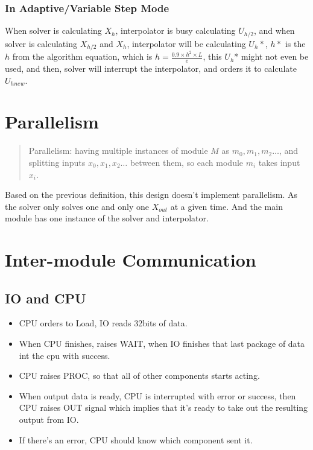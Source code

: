 \documentclass[12pt]{report}
\begin{document}
\subsubsection{In Adaptive/Variable Step Mode} 
When solver is calculating $X_h$, interpolator is busy calculating $U_{h/2}$, and when solver is calculating $X_{h/2}$ and $X_{h}$, interpolator will be calculating $U_{h}*$, $h*$ is the $h$ from the algorithm equation, which is $h = \frac{0.9 \times h^2 \times L}{e}$, this $U_{h}$* might not even be used, and then, solver will interrupt the interpolator, and orders it to calculate $U_{hnew}$.

\section{Parallelism}
\label{sec:parallel}
\begin{verse}
    Parallelism: having multiple instances of module $M$ as $m_0, m_1, m_2 \dots$, and splitting inputs $x_0, x_1, x_2 \dots$ between them, so each module $m_i$ takes input $x_i$.
\end{verse}
Based on the previous definition, this design doesn't implement parallelism. As the solver only solves one and only one $X_{out}$ at a given time. And the main module has one instance of the solver and interpolator.


\section{Inter-module Communication}

\subsection{IO and CPU}
\begin{itemize}
    \item CPU orders to Load, IO reads 32bits of data.
    \item When CPU finishes, raises WAIT, when IO finishes that last package of data int the cpu with success.
    \item CPU raises PROC, so that all of other components starts acting.
    \item When output data is ready, CPU is interrupted with error or success, then CPU raises OUT signal which implies that it's ready to take out the resulting output from IO.
    \item If there's an error, CPU should know which component sent it.
\end{itemize}
\end{document}
